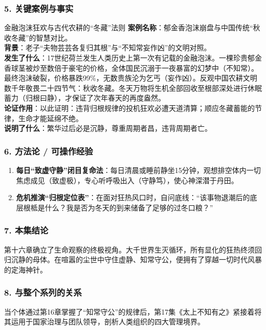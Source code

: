 \subsubsection{5. 关键案例与事实}
\begin{CaseBox}{金融泡沫狂欢与古代农耕的“冬藏”法则}
\textbf{案例名称}：郁金香泡沫崩盘与中国传统“秋收冬藏”的智慧对比。\\
\textbf{背景}：老子“夫物芸芸各复归其根”与“不知常妄作凶”的文明对照。\\
\textbf{发生了什么}：17世纪荷兰发生人类历史上第一次有记载的金融泡沫。一棵珍贵郁金香球茎被炒至数倍于豪宅的价格，全体国民沉溺于一夜暴富的幻梦中（不知常）。最终泡沫破裂，价格暴跌99\%，无数贵族沦为乞丐（妄作凶）。反观中国农耕文明数千年敬畏二十四节气：秋收冬藏。冬天万物将生机全部回收至根部深处进行休眠蓄力（归根曰静），才保证了次年春天的再度盎然。\\
\textbf{论证作用}：以此证明：违背归根规律的投机狂欢必遭天道清算；顺应冬藏蓄能的节律，生命才能延绵不绝。\\
\textbf{说明了什么}：繁华过后必是沉静，尊重周期者昌，违背周期者亡。
\end{CaseBox}

\subsubsection{6. 方法论 / 可操作经验}
\begin{enumerate}
    \item \textbf{每日“致虚守静”闭目复命法}：每日清晨或睡前静坐15分钟，观想排空体内一切焦虑成见（致虚极），专心听呼吸出入（守静笃），使心神深潜于丹田。
    \item \textbf{危机推演“归根定位表”}：在面对狂热风口时，自问底线：“该事物退潮后的底层根柢是什么？我是否为冬天的到来储备了足够的过冬口粮？”
\end{enumerate}

\subsubsection{7. 本集结论}
第十六章确立了生命观察的终极视角。大千世界生灭循环，所有显化的狂热终须回归沉静的母体。在喧嚣的尘世中守住虚静、知常守公，便拥有了穿越一切时代风暴的定海神针。

\subsubsection{8. 与整个系列的关系}
当个体通过第16章掌握了“知常守公”的规律后，第17集《太上不知有之》紧接着将其运用于国家治理与团队领导，剖析人类组织的四大管理境界。

